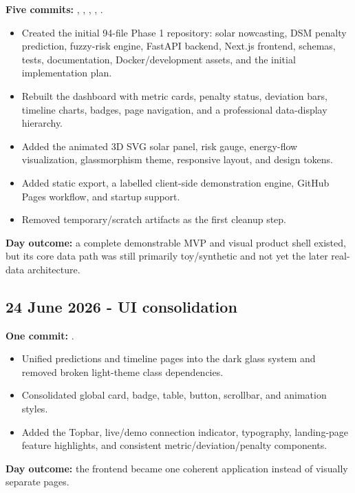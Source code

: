 \documentclass[10pt,a4paper]{article}
\begin{document}
\textbf{Five commits:} , , ,
, .

\begin{itemize}
  \item Created the initial 94-file Phase 1 repository: solar nowcasting, DSM penalty prediction,
        fuzzy-risk engine, FastAPI backend, Next.js frontend, schemas, tests, documentation,
        Docker/development assets, and the initial implementation plan.
  \item Rebuilt the dashboard with metric cards, penalty status, deviation bars, timeline charts,
        badges, page navigation, and a professional data-display hierarchy.
  \item Added the animated 3D SVG solar panel, risk gauge, energy-flow visualization, glassmorphism
        theme, responsive layout, and design tokens.
  \item Added static export, a labelled client-side demonstration engine, GitHub Pages workflow,
        and startup support.
  \item Removed temporary/scratch artifacts as the first cleanup step.
\end{itemize}

\textbf{Day outcome:} a complete demonstrable MVP and visual product shell existed, but its core
data path was still primarily toy/synthetic and not yet the later real-data architecture.

\subsection{24 June 2026 - UI consolidation}

\textbf{One commit:} .

\begin{itemize}
  \item Unified predictions and timeline pages into the dark glass system and removed broken
        light-theme class dependencies.
  \item Consolidated global card, badge, table, button, scrollbar, and animation styles.
  \item Added the Topbar, live/demo connection indicator, typography, landing-page feature
        highlights, and consistent metric/deviation/penalty components.
\end{itemize}

\textbf{Day outcome:} the frontend became one coherent application instead of visually separate
pages.
\end{document}
